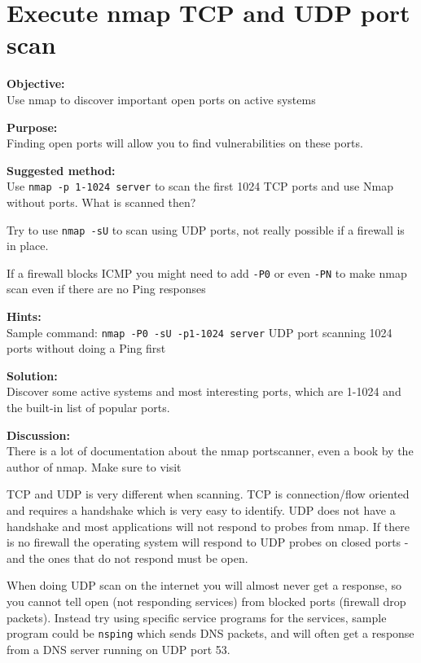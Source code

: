 \documentclass[a4paper,11pt,notitlepage]{report}
\begin{document}
\chapter{Execute nmap TCP and UDP port scan}
\label{ex:nmap-synscan}


{\bf Objective:} \\
Use nmap to discover important open ports on active systems

{\bf Purpose:}\\
Finding open ports will allow you to find vulnerabilities on these ports.

{\bf Suggested method:}\\
Use \verb+nmap -p 1-1024 server+ to scan the first 1024 TCP
ports and use Nmap without ports. What is scanned then?

Try to use \verb+nmap -sU+ to scan using UDP ports, not really possible if a firewall is in place.

If a firewall blocks ICMP you might need to add \verb+-P0+
or even \verb+-PN+ to make nmap scan even if there are no Ping responses

{\bf Hints:} \\
Sample command: \verb+nmap -P0 -sU -p1-1024 server+ UDP port scanning
1024 ports without doing a Ping first

{\bf Solution:}\\
Discover some active systems and most interesting ports, which are 1-1024 and the built-in list of popular ports.

{\bf Discussion:}\\
There is a lot of documentation about the nmap portscanner, even a book by the author
of nmap. Make sure to visit 

TCP and UDP is very different when scanning. TCP is connection/flow oriented and requires a handshake which is very easy to identify. UDP does not have a handshake and most applications will not respond to probes from nmap. If there is no firewall the operating system will respond to UDP probes on closed ports - and the ones that do not respond must be open.

When doing UDP scan on the internet you will almost never get a response, so you cannot tell open (not responding services) from blocked ports (firewall drop packets). Instead try using specific service programs for the services, sample program could be \verb+nsping+ which sends DNS packets, and will often get a response from a DNS server running on UDP port 53.
\end{document}
